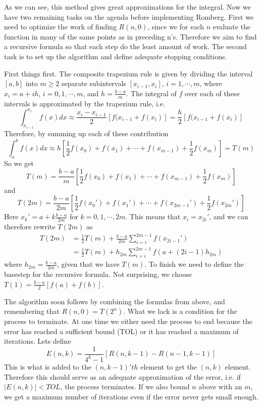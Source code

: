 \documentclass[12pt, a4paper,usenames,dvipsnames]{article}
\begin{document}
As we can see, this method gives great approximations for the integral. Now we have two remaining tasks on the agenda before implementing Romberg. First we need to optimize the work of finding \(R(n,0)\), since we for each \(n\) evaluate the function in many of the same points as in preceding n's. Therefore we aim to find a recursive formula so that each step do the least amount of work. The second task is to set up the algorithm and define adequate stopping conditions.

First things first. The composite trapezium rule is given by dividing the interval \([a,b]\) into \(m\geq2\) separate subintervals \([x_{i-1},x_i]\), \(i=1,\cdots,m\), where \(x_i=a+ih\), \(i=0,1,\cdots,m\), and \(h=\frac{b-a}{m}\). The integral of \(f\) over each of these intervals is approximated by the trapezium rule, i.e.
\[\int_{x_{i-1}}^{x_i}f(x)dx\approx\frac{x_{i}-x_{i-1}}{2}[f(x_{i-1}+f(x_i)]=\frac{h}{2}[f(x_{i-1}+f(x_i)]\]
Therefore, by summing up each of these contribution
\[\int_a^bf(x)dx\approx h\left[\frac{1}{2}f(x_0)+f(x_1)+\cdots+f(x_{m-1})+\frac{1}{2}f(x_m)\right]=T(m)\]
So we get 
\[T(m)=\frac{b-a}{m}\left[\frac{1}{2}f(x_0)+f(x_1)+\cdots+f(x_{m-1})+\frac{1}{2}f(x_m)\right]\]
and
\[T(2m)=\frac{b-a}{2m}\left[\frac{1}{2}f(x_0')+f(x_1')+\cdots+f(x_{2m-1}')+\frac{1}{2}f(x_{2m}')\right]\]
Here \(x_k'=a+k\frac{b-a}{2m}\) for \(k=0,1,\cdots,2m\). This means that \(x_i=x_{2i}'\), and we can therefore rewrite \(T(2m)\) as
\begin{equation*}
\begin{split}
T(2m)&=\frac{1}{2}T(m)+\frac{b-a}{2m}\sum_{i=i}^{2m-1}f(x_{2i-1}')\\
&=\frac{1}{2}T(m)+h_{2m}\sum_{i=i}^{2m-1}f(a+(2i-1)h_{2m})
\end{split}
\end{equation*}
where \(h_{2m}=\frac{b-a}{2m}\), given that we have \(T(m)\). To finish we need to define the basestep for the recursive formula. Not surprising, we choose \(T(1)=\frac{b-a}{2}[f(a)+f(b)]\).

The algorithm soon follows by combining the formulas from above, and remembering that \(R(n,0)=T(2^n)\). What we lack is a condition for the process to terminate. At one time we either need the process to end because the error has reached a sufficient bound (TOL) or it has reached a maximum of iterations. Lets define 
\[E(n,k)=\frac{1}{4^k-1}[R(n,k-1)-R(n-1,k-1)]\]
This is what is added to the \((n,k-1)'th\) element to get the \((n,k)\) element. Therefore this should serve as an adequate approximation of the error, i.e. if \(|E(n,k)|<TOL\), the process terminates. If we also bound \(n\) above with an \(m\), we get a maximum number of iterations even if the error never gets small enough. 
\end{document}

